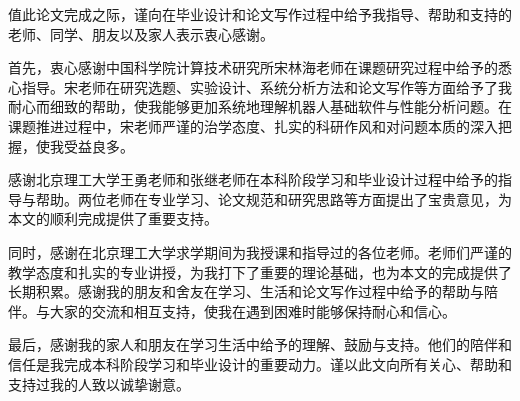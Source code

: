 
\begin{acknowledgements}
值此论文完成之际，谨向在毕业设计和论文写作过程中给予我指导、帮助和支持的老师、同学、朋友以及家人表示衷心感谢。

首先，衷心感谢中国科学院计算技术研究所宋林海老师在课题研究过程中给予的悉心指导。宋老师在研究选题、实验设计、系统分析方法和论文写作等方面给予了我耐心而细致的帮助，使我能够更加系统地理解机器人基础软件与性能分析问题。在课题推进过程中，宋老师严谨的治学态度、扎实的科研作风和对问题本质的深入把握，使我受益良多。

感谢北京理工大学王勇老师和张继老师在本科阶段学习和毕业设计过程中给予的指导与帮助。两位老师在专业学习、论文规范和研究思路等方面提出了宝贵意见，为本文的顺利完成提供了重要支持。

同时，感谢在北京理工大学求学期间为我授课和指导过的各位老师。老师们严谨的教学态度和扎实的专业讲授，为我打下了重要的理论基础，也为本文的完成提供了长期积累。感谢我的朋友和舍友在学习、生活和论文写作过程中给予的帮助与陪伴。与大家的交流和相互支持，使我在遇到困难时能够保持耐心和信心。

最后，感谢我的家人和朋友在学习生活中给予的理解、鼓励与支持。他们的陪伴和信任是我完成本科阶段学习和毕业设计的重要动力。谨以此文向所有关心、帮助和支持过我的人致以诚挚谢意。
\end{acknowledgements}
